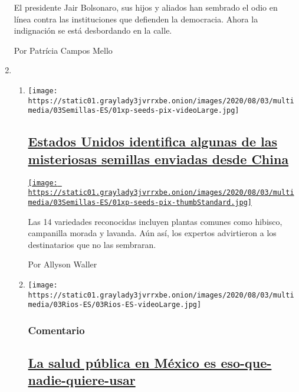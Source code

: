 \begin{enumerate}
  El presidente Jair Bolsonaro, sus hijos y aliados han sembrado el odio
  en línea contra las instituciones que defienden la democracia. Ahora
  la indignación se está desbordando en la calle.

  Por Patrícia Campos Mello
\item
  \begin{enumerate}
  \def\labelenumii{\arabic{enumii}.}
  \item
    \texttt{[image: https://static01.graylady3jvrrxbe.onion/images/2020/08/03/multimedia/03Semillas-ES/01xp-seeds-pix-videoLarge.jpg]}

    \hypertarget{estados-unidos-identifica-algunas-de-las-misteriosas-semillas-enviadas-desde-china}{%
    \subsection{\texorpdfstring{\href{/es/2020/08/03/espanol/estados-unidos/semillas-correo-china.html}{Estados
    Unidos identifica algunas de las misteriosas semillas enviadas desde
    China}}{Estados Unidos identifica algunas de las misteriosas semillas enviadas desde China}}\label{estados-unidos-identifica-algunas-de-las-misteriosas-semillas-enviadas-desde-china}}

    \href{/es/2020/08/03/espanol/estados-unidos/semillas-correo-china.html}{\texttt{[image: https://static01.graylady3jvrrxbe.onion/images/2020/08/03/multimedia/03Semillas-ES/01xp-seeds-pix-thumbStandard.jpg]}}

    Las 14 variedades reconocidas incluyen plantas comunes como hibisco,
    campanilla morada y lavanda. Aún así, los expertos advirtieron a los
    destinatarios que no las sembraran.

    Por Allyson Waller
  \item
    \texttt{[image: https://static01.graylady3jvrrxbe.onion/images/2020/08/03/multimedia/03Rios-ES/03Rios-ES-videoLarge.jpg]}

    \hypertarget{comentario-1}{%
    \subsubsection{Comentario}\label{comentario-1}}

    \hypertarget{la-salud-puxfablica-en-muxe9xico-es-eso-que-nadie-quiere-usar}{%
    \subsection{\texorpdfstring{\href{/es/2020/08/03/espanol/opinion/servicio-salud-mexico.html}{La
    salud pública en México es
    eso-que-nadie-quiere-usar}}{La salud pública en México es eso-que-nadie-quiere-usar}}\label{la-salud-puxfablica-en-muxe9xico-es-eso-que-nadie-quiere-usar}}


\end{enumerate}
\end{enumerate}
